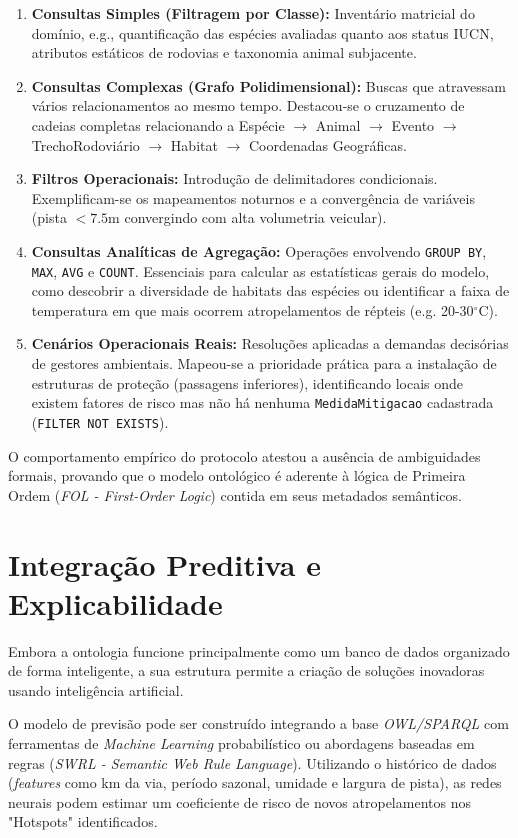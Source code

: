 \documentclass[10pt,conference]{IEEEtran}
\begin{document}
\begin{enumerate}
    \item \textbf{Consultas Simples (Filtragem por Classe):} Inventário matricial do domínio, e.g., quantificação das espécies avaliadas quanto aos status IUCN, atributos estáticos de rodovias e taxonomia animal subjacente.
    \item \textbf{Consultas Complexas (Grafo Polidimensional):} Buscas que atravessam vários relacionamentos ao mesmo tempo. Destacou-se o cruzamento de cadeias completas relacionando a Espécie $\rightarrow$ Animal $\rightarrow$ Evento $\rightarrow$ TrechoRodoviário $\rightarrow$ Habitat $\rightarrow$ Coordenadas Geográficas.
    \item \textbf{Filtros Operacionais:} Introdução de delimitadores condicionais. Exemplificam-se os mapeamentos noturnos e a convergência de variáveis (pista $< 7.5$m convergindo com alta volumetria veicular).
    \item \textbf{Consultas Analíticas de Agregação:} Operações envolvendo \texttt{GROUP BY}, \texttt{MAX}, \texttt{AVG} e \texttt{COUNT}. Essenciais para calcular as estatísticas gerais do modelo, como descobrir a diversidade de habitats das espécies ou identificar a faixa de temperatura em que mais ocorrem atropelamentos de répteis (e.g. 20-30$^\circ$C).
    \item \textbf{Cenários Operacionais Reais:} Resoluções aplicadas a demandas decisórias de gestores ambientais. Mapeou-se a prioridade prática para a instalação de estruturas de proteção (passagens inferiores), identificando locais onde existem fatores de risco mas não há nenhuma \texttt{MedidaMitigacao} cadastrada (\texttt{FILTER NOT EXISTS}).
\end{enumerate}

O comportamento empírico do protocolo atestou a ausência de ambiguidades formais, provando que o modelo ontológico é aderente à lógica de Primeira Ordem (\textit{FOL - First-Order Logic}) contida em seus metadados semânticos.

\section{Integração Preditiva e Explicabilidade}

Embora a ontologia funcione principalmente como um banco de dados organizado de forma inteligente, a sua estrutura permite a criação de soluções inovadoras usando inteligência artificial.

O modelo de previsão pode ser construído integrando a base \textit{OWL/SPARQL} com ferramentas de \textit{Machine Learning} probabilístico ou abordagens baseadas em regras (\textit{SWRL - Semantic Web Rule Language}). Utilizando o histórico de dados (\textit{features} como km da via, período sazonal, umidade e largura de pista), as redes neurais podem estimar um coeficiente de risco de novos atropelamentos nos "Hotspots" identificados.
\end{document}
